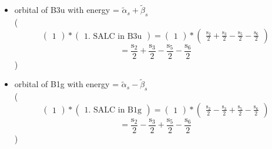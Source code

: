 \documentclass[12pt,a4paper]{article}
\begin{document}
\begin{itemize}
$$ $$ $$ = \frac{4 beta_{\text{s}_N} \left(\text{s}_{1} - \text{s}_{4}\right) + \left(\tilde{\alpha}_{s} - alpha_{\text{s}_N} - \tilde{\beta}_{s} + \sqrt{\tilde{\alpha}_{s}^{2} - 2 \tilde{\alpha}_{s} alpha_{\text{s}_N} - 2 \tilde{\alpha}_{s} \tilde{\beta}_{s} + alpha_{\text{s}_N}^{2} + 2 alpha_{\text{s}_N} \tilde{\beta}_{s} + \tilde{\beta}_{s}^{2} + 8 beta_{\text{s}_N}^{2}}\right) \left(\text{s}_{2} - \text{s}_{3} - \text{s}_{5} + \text{s}_{6}\right)}{2 \sqrt{8 \left|{\frac{beta_{\text{s}_N}}{\tilde{\alpha}_{s} - alpha_{\text{s}_N} - \tilde{\beta}_{s} + \sqrt{\tilde{\alpha}_{s}^{2} - 2 \tilde{\alpha}_{s} alpha_{\text{s}_N} - 2 \tilde{\alpha}_{s} \tilde{\beta}_{s} + alpha_{\text{s}_N}^{2} + 2 alpha_{\text{s}_N} \tilde{\beta}_{s} + \tilde{\beta}_{s}^{2} + 8 beta_{\text{s}_N}^{2}}}}\right|^{2} + 1} \left(\tilde{\alpha}_{s} - alpha_{\text{s}_N} - \tilde{\beta}_{s} + \sqrt{\tilde{\alpha}_{s}^{2} - 2 \tilde{\alpha}_{s} alpha_{\text{s}_N} - 2 \tilde{\alpha}_{s} \tilde{\beta}_{s} + alpha_{\text{s}_N}^{2} + 2 alpha_{\text{s}_N} \tilde{\beta}_{s} + \tilde{\beta}_{s}^{2} + 8 beta_{\text{s}_N}^{2}}\right)} 
 $$ 
 )

\item orbital of B3u with energy = 
                                $\tilde{\alpha}_{s} + \tilde{\beta}_{s}$ \\
( 
$$
\begin{pmatrix}1\end{pmatrix} * \left(\begin{array}{c}\text{1. SALC in B3u}\end{array}\right) = \begin{pmatrix}1\end{pmatrix} * \begin{pmatrix}\frac{\text{s}_{2}}{2} + \frac{\text{s}_{3}}{2} - \frac{\text{s}_{5}}{2} - \frac{\text{s}_{6}}{2}\end{pmatrix} 
 $$ $$ = \frac{\text{s}_{2}}{2} + \frac{\text{s}_{3}}{2} - \frac{\text{s}_{5}}{2} - \frac{\text{s}_{6}}{2} 
 $$ 
 )

\item orbital of B1g with energy = 
                                $\tilde{\alpha}_{s} - \tilde{\beta}_{s}$ \\
( 
$$
\begin{pmatrix}1\end{pmatrix} * \left(\begin{array}{c}\text{1. SALC in B1g}\end{array}\right) = \begin{pmatrix}1\end{pmatrix} * \begin{pmatrix}\frac{\text{s}_{2}}{2} - \frac{\text{s}_{3}}{2} + \frac{\text{s}_{5}}{2} - \frac{\text{s}_{6}}{2}\end{pmatrix} 
 $$ $$ = \frac{\text{s}_{2}}{2} - \frac{\text{s}_{3}}{2} + \frac{\text{s}_{5}}{2} - \frac{\text{s}_{6}}{2} 
 $$ 
 )

\end{itemize}
\end{document}
